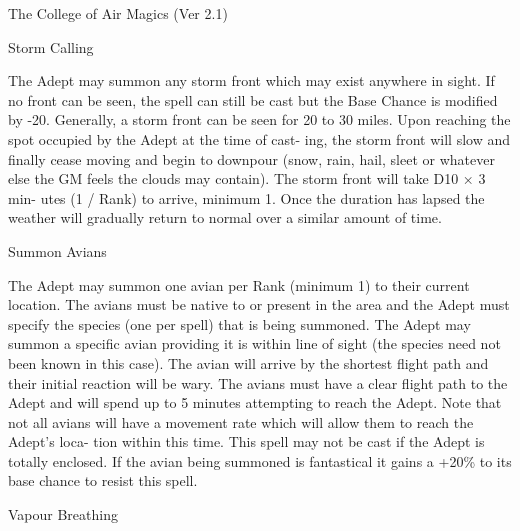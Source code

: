 \begin{Chapter}{The College of Air Magics (Ver 2.1)}
\begin{spell}[G-6]{Storm Calling }
\begin{effects}
 The  Adept  may  summon  any  storm  front 
which may exist anywhere in sight. If no front can 
be  seen,  the  spell  can  still  be  cast  but  the  Base 
Chance  is  modified  by  -20.  Generally,  a  storm 
front can be seen for 20 to 30 miles. Upon reaching 
the spot occupied by the Adept at the time of cast-
ing,  the  storm  front  will  slow  and  finally  cease 
moving  and  begin  to  downpour  (snow,  rain,  hail, 
sleet or whatever else the GM feels the clouds may 
contain).  The  storm  front  will  take  D10  ×  3  min-
utes  (1  /  Rank)  to  arrive,  minimum  1.  Once  the 
duration  has  lapsed  the  weather  will  gradually 
return to normal over a similar amount of time. 

\end{effects}
\end{spell}

\begin{spell}[G-7]{Summon Avians }

\begin{effects}
 The  Adept  may  summon  one  avian  per 
Rank  (minimum  1)  to  their  current  location.  The 
avians must be native to or present in the area and 
the  Adept  must  specify  the  species  (one  per  spell) 
that is being summoned. The Adept may summon a 
specific  avian  providing  it  is  within  line  of  sight 
(the species need not been known in this case). The 
avian  will  arrive  by  the  shortest  flight  path  and 
their initial reaction will be wary. The avians must 
have a clear flight path to the Adept and will spend 
up  to  5  minutes  attempting  to  reach  the  Adept. 
Note that not all avians will have a movement rate 
which  will  allow  them  to  reach  the  Adept’s  loca-
tion within this time. This spell may  not be cast if 
the  Adept  is  totally  enclosed.  If  the  avian  being 
summoned is fantastical it gains a +20\% to its base 
chance to resist this spell. 

\end{effects}
\end{spell}

\begin{spell}[G-8]{Vapour Breathing }


\end{spell}
\end{Chapter}
